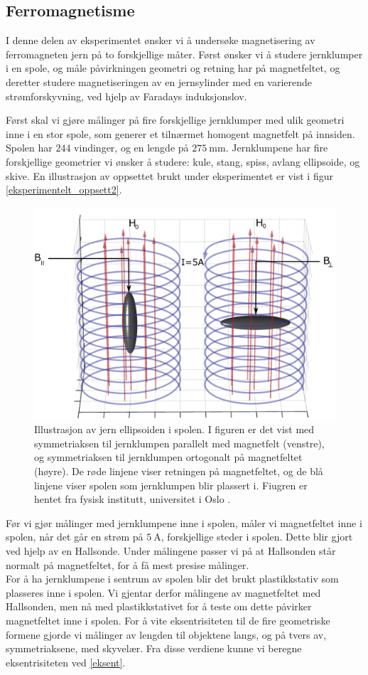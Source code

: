 \documentclass[%
 reprint,
 amsmath,amssymb,
 aps,
 norsk,
]{revtex4-1}
\begin{document}
\subsection{Ferromagnetisme}
I denne delen av eksperimentet ønsker vi å undersøke magnetisering av ferromagneten jern på to forskjellige måter. Først ønsker vi å studere jernklumper i en spole, og måle påvirkningen geometri og retning har på magnetfeltet, og deretter studere magnetiseringen av en jernsylinder med en varierende strømforskyvning, ved hjelp av Faradays induksjonslov. \par
Først skal vi gjøre målinger på fire forskjellige jernklumper med ulik geometri inne i en stor spole, som generer et tilnærmet homogent magnetfelt på innsiden. Spolen har $244$ vindinger, og en lengde på $\SI{275}{\milli\meter}$. Jernklumpene har fire forskjellige geometrier vi ønsker å studere: kule, stang, spiss, avlang ellipsoide, og skive. En illustrasjon av oppsettet brukt under eksperimentet er vist i figur \vref{eksperimentelt_oppsett2}.
\begin{figure}[h!]
  \centering
  \includegraphics[scale=0.24]{oppsett2.png}
  \caption{Illustrasjon av jern ellipsoiden i spolen. I figuren er det vist med symmetriaksen til jernklumpen parallelt med magnetfelt (venstre), og symmetriaksen til jernklumpen ortogonalt på magnetfeltet (høyre). De røde linjene viser retningen på magnetfeltet, og de blå linjene viser spolen som jernklumpen blir plassert i. Fiugren er hentet fra fysisk institutt, universitet i Oslo \cite{oppgave}.}
  \label{eksperimentelt_oppsett2}
\end{figure}
Før vi gjør målinger med jernklumpene inne i spolen, måler vi magnetfeltet inne i spolen, når det går en strøm på $\SI{5}{\ampere}$, forskjellige steder i spolen. Dette blir gjort ved hjelp av en Hallsonde. Under målingene passer vi på at Hallsonden står normalt på magnetfeltet, for å få mest presise målinger.\\For å ha jernklumpene i sentrum av spolen blir det brukt plastikkstativ som plasseres inne i spolen. Vi gjentar derfor målingene av magnetfeltet med Hallsonden, men nå med plastikkstativet for å teste om dette påvirker magnetfeltet inne i spolen. For å vite eksentrisiteten til de fire geometriske formene gjorde vi målinger av lengden til objektene langs, og på tvers av, symmetriaksene, med skyvelær. Fra disse verdiene kunne vi beregne eksentrisiteten ved \eqref{eksent}.\\
\end{document}
